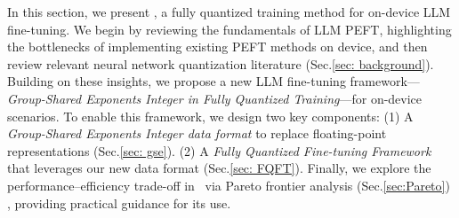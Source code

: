 In this section, we present \methodname, a fully quantized training method for on-device LLM fine-tuning. We begin by reviewing the fundamentals of LLM PEFT, highlighting the bottlenecks of implementing existing PEFT methods on device, and then review relevant neural network quantization literature (Sec.\ref{sec: background}). Building on these insights, we propose a new LLM fine-tuning framework—\emph{Group-Shared Exponents Integer in Fully Quantized Training}—for on-device scenarios. To enable this framework, we design two key components: (1) A \emph{Group-Shared Exponents Integer data format} to replace floating-point representations (Sec.\ref{sec: gse}). 
(2) A \emph{Fully Quantized Fine-tuning Framework} that leverages our new data format (Sec.\ref{sec: FQFT}). 
Finally, we explore the performance–efficiency trade-off in \methodname~via Pareto frontier analysis (Sec.\ref{sec:Pareto}) , providing practical guidance for its use.